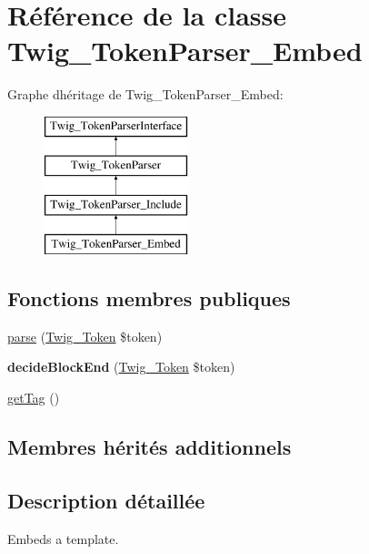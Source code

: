 \hypertarget{class_twig___token_parser___embed}{}\section{Référence de la classe Twig\+\_\+\+Token\+Parser\+\_\+\+Embed}
\label{class_twig___token_parser___embed}
Graphe d\textquotesingle{}héritage de Twig\+\_\+\+Token\+Parser\+\_\+\+Embed\+:\begin{figure}[H]
\begin{center}
\leavevmode
\includegraphics[height=4.000000cm]{class_twig___token_parser___embed}
\end{center}
\end{figure}
\subsection*{Fonctions membres publiques}
\begin{DoxyCompactItemize}
\item 
\hyperlink{class_twig___token_parser___embed_a5dfa2e269321584fb74e8b43dabe0efd}{parse} (\hyperlink{class_twig___token}{Twig\+\_\+\+Token} \$token)
\item 
{\bfseries decide\+Block\+End} (\hyperlink{class_twig___token}{Twig\+\_\+\+Token} \$token)\hypertarget{class_twig___token_parser___embed_aa976dc013d35c2813752149bacd88902}{}\label{class_twig___token_parser___embed_aa976dc013d35c2813752149bacd88902}

\item 
\hyperlink{class_twig___token_parser___embed_ab86ba36154b20e6bbfa3ba705f12f9d6}{get\+Tag} ()
\end{DoxyCompactItemize}
\subsection*{Membres hérités additionnels}


\subsection{Description détaillée}
Embeds a template. 

